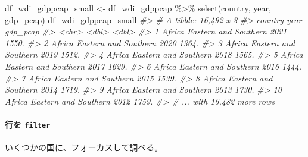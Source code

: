 \documentclass[
]{bxjsbook}
\newenvironment{Shaded}{\begin{snugshade}}{\end{snugshade}}
\newcommand{\CommentTok}[1]{\textcolor[rgb]{0.56,0.35,0.01}{\textit{#1}}}
\newcommand{\FunctionTok}[1]{\textcolor[rgb]{0.00,0.00,0.00}{#1}}
\newcommand{\NormalTok}[1]{#1}
\newcommand{\OtherTok}[1]{\textcolor[rgb]{0.56,0.35,0.01}{#1}}
\newcommand{\SpecialCharTok}[1]{\textcolor[rgb]{0.00,0.00,0.00}{#1}}
\theoremstyle{definition}
\theoremstyle{definition}
\theoremstyle{definition}
\theoremstyle{definition}
\theoremstyle{remark}
\begin{document}
\begin{Shaded}
\begin{Highlighting}[]
\NormalTok{df\_wdi\_gdppcap\_small }\OtherTok{\textless{}{-}}\NormalTok{ df\_wdi\_gdppcap }\SpecialCharTok{\%\textgreater{}\%} 
  \FunctionTok{select}\NormalTok{(country, year, gdp\_pcap)}
\NormalTok{df\_wdi\_gdppcap\_small}
\CommentTok{\#\textgreater{} \# A tibble: 16,492 x 3}
\CommentTok{\#\textgreater{}    country                      year gdp\_pcap}
\CommentTok{\#\textgreater{}    \textless{}chr\textgreater{}                       \textless{}dbl\textgreater{}    \textless{}dbl\textgreater{}}
\CommentTok{\#\textgreater{}  1 Africa Eastern and Southern  2021    1550.}
\CommentTok{\#\textgreater{}  2 Africa Eastern and Southern  2020    1364.}
\CommentTok{\#\textgreater{}  3 Africa Eastern and Southern  2019    1512.}
\CommentTok{\#\textgreater{}  4 Africa Eastern and Southern  2018    1565.}
\CommentTok{\#\textgreater{}  5 Africa Eastern and Southern  2017    1629.}
\CommentTok{\#\textgreater{}  6 Africa Eastern and Southern  2016    1444.}
\CommentTok{\#\textgreater{}  7 Africa Eastern and Southern  2015    1539.}
\CommentTok{\#\textgreater{}  8 Africa Eastern and Southern  2014    1719.}
\CommentTok{\#\textgreater{}  9 Africa Eastern and Southern  2013    1730.}
\CommentTok{\#\textgreater{} 10 Africa Eastern and Southern  2012    1759.}
\CommentTok{\#\textgreater{} \# ... with 16,482 more rows}
\end{Highlighting}
\end{Shaded}

\hypertarget{ux884cux3092-filter}{%
\paragraph{\texorpdfstring{行を \texttt{filter}}{行を filter}}\label{ux884cux3092-filter}}

いくつかの国に、フォーカスして調べる。
\end{document}
